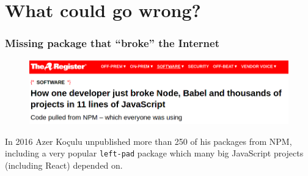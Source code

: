 \documentclass[aspectratio=169]{beamer}              %
\begin{document}
\section{What could go wrong?}

\begin{frame}
	\frametitle{Missing package that ``broke'' the Internet}
	
	\begin{figure}[ht!]
	\begin{center}
  	  \includegraphics[width=12cm]{img/deps-npm-2.png}
	\end{center}
	\end{figure}
	
	\begin{block}{}
		In 2016 Azer Koçulu unpublished more than 250 of his packages from NPM, including a very popular \texttt{left-pad} package which many big JavaScript projects (including React) depended on.\footnotemark~\footnotemark
	\end{block}

\end{frame}
\end{document}

